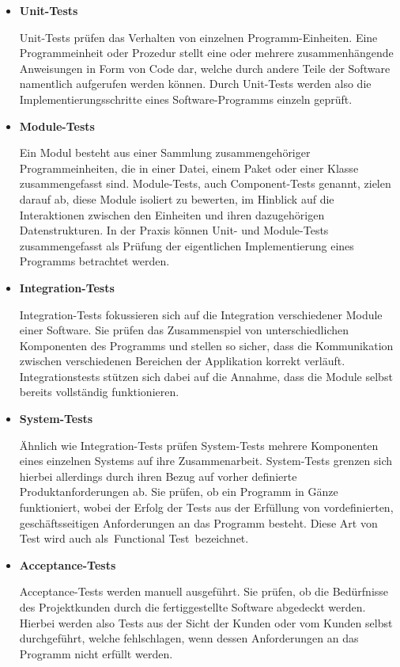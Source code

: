 \begin{itemize}
    \item {
        \textbf{Unit-Tests}\par
        Unit-Tests prüfen das Verhalten von einzelnen Programm-Einheiten.
        Eine Programmeinheit oder Prozedur stellt eine oder mehrere zusammenhängende Anweisungen in Form von Code dar,
        welche durch andere Teile der Software namentlich aufgerufen werden können.
        Durch Unit-Tests werden also die Implementierungsschritte eines Software-Programms einzeln geprüft.
    }

    \item {
        \textbf{Module-Tests}\par
        Ein Modul besteht aus einer Sammlung zusammengehöriger Programmeinheiten, die in einer Datei, einem Paket oder
        einer Klasse zusammengefasst sind.
        Module-Tests, auch Component-Tests genannt, zielen darauf ab, diese Module isoliert zu bewerten, im Hinblick auf
        die Interaktionen zwischen den Einheiten und ihren dazugehörigen Datenstrukturen.
        In der Praxis können Unit- und Module-Tests zusammengefasst als Prüfung der eigentlichen Implementierung eines
        Programms betrachtet werden.
    }

    \item {
        \textbf{Integration-Tests}\par
        Integration-Tests fokussieren sich auf die Integration verschiedener Module einer Software.
        Sie prüfen das Zusammenspiel von unterschiedlichen Komponenten des Programms und stellen so sicher, dass die
        Kommunikation zwischen verschiedenen Bereichen der Applikation korrekt verläuft.
        Integrationstests stützen sich dabei auf die Annahme, dass die Module selbst bereits vollständig funktionieren.
    }

    \item {
        \textbf{System-Tests}\par
        Ähnlich wie Integration-Tests prüfen System-Tests mehrere Komponenten eines einzelnen Systems auf ihre
        Zusammenarbeit.
        System-Tests grenzen sich hierbei allerdings durch ihren Bezug auf vorher definierte Produktanforderungen ab.
        Sie prüfen, ob ein Programm in Gänze funktioniert, wobei der Erfolg der Tests aus der Erfüllung von
        vordefinierten, geschäftsseitigen Anforderungen an das Programm besteht.
        Diese Art von Test wird auch als\ \glqq Functional Test\grqq\ bezeichnet.
    }

    \item {
        \textbf{Acceptance-Tests}\par
        Acceptance-Tests werden manuell ausgeführt.
        Sie prüfen, ob die Bedürfnisse des Projektkunden durch die fertiggestellte Software abgedeckt werden.
        Hierbei werden also Tests aus der Sicht der Kunden oder vom Kunden selbst durchgeführt, welche fehlschlagen,
        wenn dessen Anforderungen an das Programm nicht erfüllt werden.
    }
\end{itemize}

